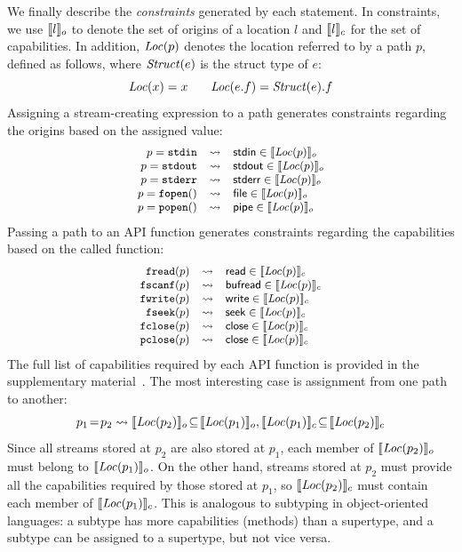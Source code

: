 We finally describe the \emph{constraints} generated by each statement.
%
In constraints, we use $\llbracket l\rrbracket_o$ to denote the set of origins of a location
$l$ and $\llbracket l\rrbracket_c$ for the set of capabilities.
%
In addition, ${\it Loc}(p)$ denotes the location referred to by a path $p$, defined
as follows, where ${\it Struct}(e)$ is the struct type of $e$:
%
\[ \small {\it Loc}(x) = x \qquad {\it Loc}(e.f) = {\it Struct}(e).f \]
%
Assigning a stream-creating expression to a path generates constraints regarding
the origins based on the assigned value:
%
\[
  \small
  \begin{array}{@{}rcl@{}}
    p={\tt stdin}  &\rightsquigarrow&\ostdin \in\oriset{\loc{p}} \\
    p={\tt stdout} &\rightsquigarrow&\ostdout\in\oriset{\loc{p}} \\
    p={\tt stderr} &\rightsquigarrow&\ostderr\in\oriset{\loc{p}} \\
    p={\tt fopen}()&\rightsquigarrow&\ofile  \in\oriset{\loc{p}} \\
    p={\tt popen}()&\rightsquigarrow&\opipe  \in\oriset{\loc{p}} \\
  \end{array}
\]
%
Passing a path to an API function generates constraints regarding the
capabilities based on the called function:
%
\[
  \small
  \begin{array}{@{}rcl@{}}
    {\tt fread}(p) &\rightsquigarrow&\cread   \in\capset{\loc{p}} \\
    {\tt fscanf}(p)&\rightsquigarrow&\cbufread\in\capset{\loc{p}} \\
    {\tt fwrite}(p)&\rightsquigarrow&\cwrite  \in\capset{\loc{p}} \\
    {\tt fseek}(p) &\rightsquigarrow&\cseek   \in\capset{\loc{p}} \\
    {\tt fclose}(p)&\rightsquigarrow&\cclose  \in\capset{\loc{p}} \\
    {\tt pclose}(p)&\rightsquigarrow&\cclose  \in\capset{\loc{p}} \\
  \end{array}
\]
%
The full list of capabilities required by each API function is provided in the
supplementary material~\cite{supp}.
%
The most interesting case is assignment from one path to another:
%
\[
  \small
  p_1\!=\!p_2\rightsquigarrow
  \llbracket{\it Loc}(p_2)\rrbracket_o\!\subseteq\!\llbracket{\it Loc}(p_1)\rrbracket_o,
  \llbracket{\it Loc}(p_1)\rrbracket_c\!\subseteq\!\llbracket{\it Loc}(p_2)\rrbracket_c
\]
%
Since all streams stored at $p_2$ are also stored at $p_1$, each member of
$\llbracket{\it Loc}(p_2)\rrbracket_o$ must belong to $\llbracket{\it Loc}(p_1)\rrbracket_o$.
%
On the other hand, streams stored at $p_2$ must provide all the capabilities
required by those stored at $p_1$, so $\llbracket{\it Loc}(p_2)\rrbracket_c$ must contain each
member of $\llbracket{\it Loc}(p_1)\rrbracket_c$.
%
This is analogous to subtyping in object-oriented languages:
%
a subtype has more capabilities (methods) than a supertype, and a subtype can be
assigned to a supertype, but not vice versa.

